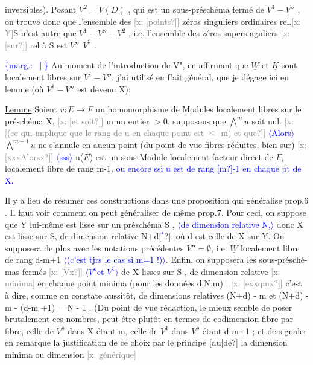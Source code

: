 \documentclass[11pt]{article}
\newcommand{\scanpage}[1]{\par\bigskip\noindent{\small\sffamily[scan #1]}\par}
\newcommand{\mspage}[1]{{\small\sffamily[p.\,#1]}}
\newcommand{\hand}[1]{\textcolor{blue}{#1}}
\newcommand{\inserted}[2][]{\textcolor{blue}{$\langle$#2$\rangle$}}
\newcommand{\margin}[1]{\textcolor{blue}{\{\textsf{marg.:} #1\}}}
\newcommand{\xout}[1]{\textcolor{gray}{[\textsf{x:} #1]}}
\newcommand{\uline}[1]{\underline{#1}}
\newcommand{\unsure}[1]{[#1?]}
\begin{document}
\mspage{\hand{154}}

\clearpage
\scanpage{25/155}
\mspage{16}

inversibles). Posant $V^2 = V(D)$ , qui est un sous-préschéma fermé de
$V^1-V''$ , on trouve donc que l'ensemble des \xout{\unsure{points}} zéros singuliers
ordinaires rel.\xout{Y}S n'est autre que $V^1 - V'' - V^2$ , i.e. l'ensemble des
zéros supersinguliers \xout{\unsure{sur}} rel à S est $V''\ \ V^2$ .

\margin{$\|$} Au moment de l'introduction de V", en affirmant que $\underline{W}$ et $\underline{K}$ sont
localement libres sur $V^1-V''$, j'ai utilisé en f'ait général, que je dégage
ici en lemme (où $V^1-V''$ est devenu X):

\uline{Lemme} Soient $v\colon \underline{E} \to \underline{F}$ un homomorphisme de Modules localement libres
sur le préschéma X, \xout{\unsure{et soit}} m un entier $>0$, supposons que $\bigwedge^{m} u$ soit
nul. \xout{\unsure{(ce qui implique que le rang de u en chaque point est $\leq$ m) et que}} \inserted[typed]{Alors}
$\bigwedge^{m-1} u$ ne s'annule en aucun point (du point de vue fibres réduites, bien
sur) \xout{\unsure{xxxAlorsx}} \inserted[typed]{sss} u($\underline{E}$) est un sous-Module localement facteur direct de $\underline{F}$,
localement libre de rang m-1, \hand{ou encore ssi u est de rang \unsure{m}-1 en}
\hand{chaque pt de X.}

Il y a lieu de résumer ces constructions dans une proposition
qui généralise prop.6 . Il faut voir comment on peut généraliser de même
prop.7. Pour ceci, on suppose que Y lui-même est lisse sur un préschéma
S , \inserted[typed]{de dimension relative N,} donc X est lisse sur S, de dimension relative N+d\unsure{\hand{$^*$}}; où d est celle de X
sur Y. On supposera de plus avec les notations précédentes $V''=\emptyset$, i.e.
$\underline{W}$ localement libre de rang d-m+1 \inserted[typed]{(c'est tjrs le cas si m=1 !)}. Enfin, on supposera les sous-présché-%
mas fermés \xout{\unsure{Vx}} \inserted[typed]{$V^o$et $V^1$} de X lisses \uline{sur} S , de dimension relative \xout{minima} en chaque
point minima (pour les données d,N,m) , \xout{\unsure{exxqmx}} c'est à dire, comme
on constate aussitôt, de dimensions relatives (N+d) - m et
(N+d) - m - (d-m +1) = N - 1 . (Du point de vue rédaction, le mieux
semble de poser brutalement ces nombres, peut être plutôt en termes
de codimension fibre par fibre, celle de $V^o$ dans X étant m, celle de
$V^1$ dans $V^o$ étant d-m+1 ; et de signaler en remarque la justification
de ce choix par le principe \unsure{du|de} la dimension minima ou dimension \xout{générique}
\end{document}
